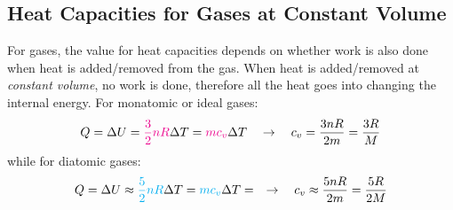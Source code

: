 \subsection{Heat Capacities for Gases at Constant Volume}

For gases, the value for heat capacities depends on whether work is also done
when heat is added/removed from the gas. When heat is added/removed at
\emph{constant volume}, no work is done, therefore all the heat goes into
changing the internal energy. For monatomic or ideal gases:
\begin{equation}
  Q=\Delta U={\color{magenta}\frac32nR}\Delta T=
  {\color{magenta}mc_v}\Delta T\quad\rightarrow\quad
  c_v=\frac{3nR}{2m}=\frac{3R}M
\end{equation}
while for diatomic gases:
\begin{equation}
  Q=\Delta U\approx{\color{cyan}\frac52nR}\Delta T
  ={\color{cyan}mc_v}\Delta T=\quad\rightarrow\quad
  c_v\approx\frac{5nR}{2m}=\frac{5R}{2M}
\end{equation}
%
%
%
%
%
%
%
%
%  
%
%
